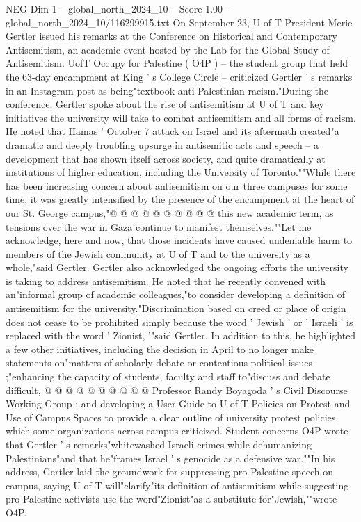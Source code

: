 \begin{textsample}{NEG Dim 1 – global\_north\_2024\_10 – Score 1.00 – global\_north\_2024\_10/116299915.txt}  \label{ex:f1_neg_078}
On September 23, U of T President Meric Gertler issued his remarks at the Conference on Historical and Contemporary Antisemitism, an academic event hosted by the Lab for the Global Study of Antisemitism.
UofT Occupy for Palestine ( O4P ) -- the student group that held the 63-day encampment at King ' s College Circle -- criticized Gertler ' s remarks in an Instagram post as being"textbook anti-Palestinian racism."During the conference, Gertler spoke about the rise of antisemitism at U of T and key initiatives the university will take to combat antisemitism and all forms of racism.
He noted that Hamas ' October 7 attack on Israel and its aftermath created"a dramatic and deeply troubling upsurge in antisemitic acts and speech -- a development that has shown itself across society, and quite dramatically at institutions of higher education, including the University of Toronto.""While there has been increasing concern about antisemitism on our three campuses for some time, it was greatly intensified by the presence of the encampment at the heart of our St.
George campus,"@ @ @ @ @ @ @ @ @ @ this new academic term, as tensions over the war in Gaza continue to manifest themselves.""Let me acknowledge, here and now, that those incidents have caused undeniable harm to members of the Jewish community at U of T and to the university as a whole,"said Gertler.
Gertler also acknowledged the ongoing efforts the university is taking to address antisemitism.
He noted that he recently convened with an"informal group of academic colleagues,"to consider developing a definition of antisemitism for the university."Discrimination based on creed or place of origin does not cease to be prohibited simply because the word ' Jewish ' or ' Israeli ' is replaced with the word ' Zionist, '"said Gertler.
In addition to this, he highlighted a few other initiatives, including the decision in April to no longer make statements on"matters of scholarly debate or contentious political issues ;"enhancing the capacity of students, faculty and staff to"discuss and debate difficult, @ @ @ @ @ @ @ @ @ @ Professor Randy Boyagoda ' s Civil Discourse Working Group ; and developing a User Guide to U of T Policies on Protest and Use of Campus Spaces to provide a clear outline of university protest policies, which some organizations across campus criticized.
Student concerns O4P wrote that Gertler ' s remarks"whitewashed Israeli crimes while dehumanizing Palestinians"and that he"frames Israel ' s genocide as a defensive war.""In his address, Gertler laid the groundwork for suppressing pro-Palestine speech on campus, saying U of T will"clarify"its definition of antisemitism while suggesting pro-Palestine activists use the word"Zionist"as a substitute for"Jewish,""wrote O4P.

\end{textsample}
